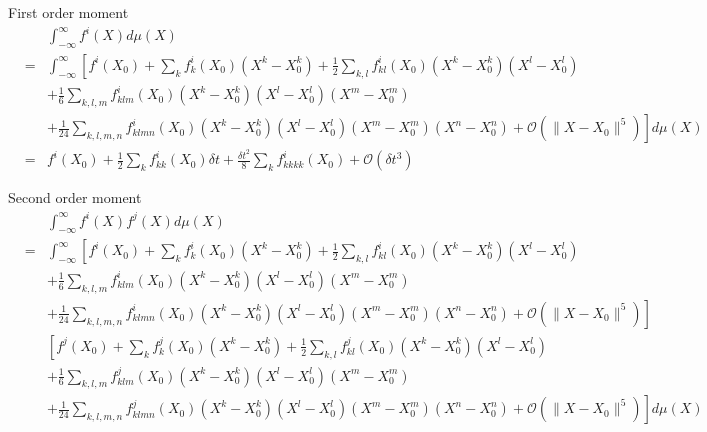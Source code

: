 \documentclass[12pt]{article}
\begin{document}
First order moment
\begin{eqnarray}
&&\int_{-\infty}^{\infty} f^i(X) d\mu(X) \\
&= & \int_{-\infty}^{\infty} \left[ f^i(X_0) + \sum_k f^i_k(X_0) (X^k-X_0^k)  + \frac{1}{2} \sum_{k,l} f^i_{kl}(X_0) (X^k-X_0^k) (X^l-X_0^l)  \right. \\
&& + \frac{1}{6} \sum_{k,l,m} f^i_{klm} (X_0) (X^k-X_0^k) (X^l-X_0^l) (X^m-X_0^m) \\
&& \left. + \frac{1}{24} \sum_{k,l,m,n} f^i_{klmn} (X_0) (X^k-X_0^k) (X^l-X_0^l) (X^m-X_0^m) (X^n-X_0^n)
+ \mathcal{O}\left( \| X- X_0 \|^5 \right) \right] d\mu(X) \\
&=& f^i(X_0) + \frac{1}{2} \sum_k f^i_{kk}(X_0) \delta t + \frac{\delta t^2}{8} \sum_{k} f^i_{kkkk} (X_0) + \mathcal{O} (\delta t^3 )
\end{eqnarray}

Second order moment
\begin{eqnarray}
&&\int_{-\infty}^{\infty} f^i(X) f^j(X) d\mu(X) \\
&= &
\int_{-\infty}^{\infty} \left[ f^i(X_0) + \sum_k f^i_k(X_0) (X^k-X_0^k)  + \frac{1}{2} \sum_{k,l} f^i_{kl}(X_0) (X^k-X_0^k) (X^l-X_0^l) \right. \\
&&  + \frac{1}{6} \sum_{k,l,m} f^i_{klm} (X_0) (X^k-X_0^k) (X^l-X_0^l) (X^m-X_0^m) \\
&& \left. + \frac{1}{24} \sum_{k,l,m,n} f^i_{klmn} (X_0) (X^k-X_0^k) (X^l-X_0^l) (X^m-X_0^m) (X^n-X_0^n)
+ \mathcal{O}\left( \| X- X_0 \|^5 \right) \right]  \\
&& \left[ f^j(X_0) + \sum_k f^j_k(X_0) (X^k-X_0^k)  + \frac{1}{2} \sum_{k,l} f^j_{kl}(X_0) (X^k-X_0^k) (X^l-X_0^l)  \right. \\
&&  + \frac{1}{6} \sum_{k,l,m} f^j_{klm} (X_0) (X^k-X_0^k) (X^l-X_0^l) (X^m-X_0^m)  \\
&&  \left. + \frac{1}{24} \sum_{k,l,m,n} f^j_{klmn} (X_0) (X^k-X_0^k) (X^l-X_0^l) (X^m-X_0^m) (X^n-X_0^n)
+ \mathcal{O}\left( \| X- X_0 \|^5 \right) \right]  d\mu(X) 
\end{eqnarray}
\end{document}
